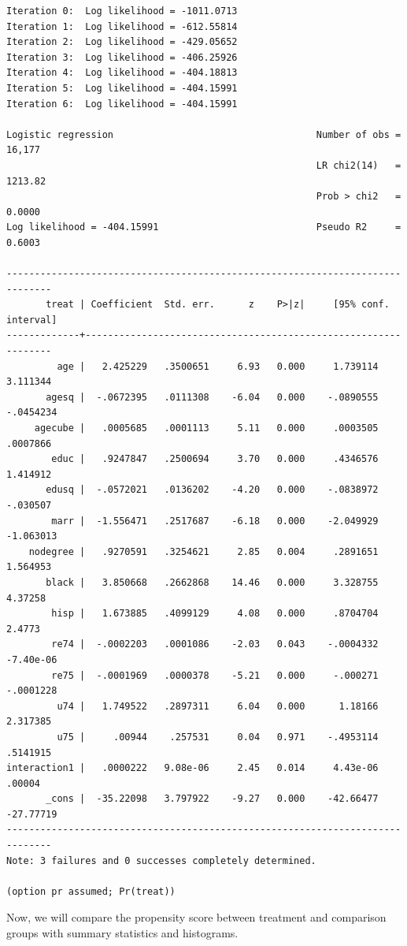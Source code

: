 \documentclass[
]{book}
\begin{document}
\begin{verbatim}
Iteration 0:  Log likelihood = -1011.0713  
Iteration 1:  Log likelihood = -612.55814  
Iteration 2:  Log likelihood = -429.05652  
Iteration 3:  Log likelihood = -406.25926  
Iteration 4:  Log likelihood = -404.18813  
Iteration 5:  Log likelihood = -404.15991  
Iteration 6:  Log likelihood = -404.15991  

Logistic regression                                    Number of obs =  16,177
                                                       LR chi2(14)   = 1213.82
                                                       Prob > chi2   =  0.0000
Log likelihood = -404.15991                            Pseudo R2     =  0.6003

------------------------------------------------------------------------------
       treat | Coefficient  Std. err.      z    P>|z|     [95% conf. interval]
-------------+----------------------------------------------------------------
         age |   2.425229   .3500651     6.93   0.000     1.739114    3.111344
       agesq |  -.0672395   .0111308    -6.04   0.000    -.0890555   -.0454234
     agecube |   .0005685   .0001113     5.11   0.000     .0003505    .0007866
        educ |   .9247847   .2500694     3.70   0.000     .4346576    1.414912
       edusq |  -.0572021   .0136202    -4.20   0.000    -.0838972    -.030507
        marr |  -1.556471   .2517687    -6.18   0.000    -2.049929   -1.063013
    nodegree |   .9270591   .3254621     2.85   0.004     .2891651    1.564953
       black |   3.850668   .2662868    14.46   0.000     3.328755     4.37258
        hisp |   1.673885   .4099129     4.08   0.000     .8704704      2.4773
        re74 |  -.0002203   .0001086    -2.03   0.043    -.0004332   -7.40e-06
        re75 |  -.0001969   .0000378    -5.21   0.000     -.000271   -.0001228
         u74 |   1.749522   .2897311     6.04   0.000      1.18166    2.317385
         u75 |     .00944    .257531     0.04   0.971    -.4953114    .5141915
interaction1 |   .0000222   9.08e-06     2.45   0.014     4.43e-06      .00004
       _cons |  -35.22098   3.797922    -9.27   0.000    -42.66477   -27.77719
------------------------------------------------------------------------------
Note: 3 failures and 0 successes completely determined.

(option pr assumed; Pr(treat))
\end{verbatim}

Now, we will compare the propensity score between treatment and comparison groups with summary statistics and histograms.
\end{document}

